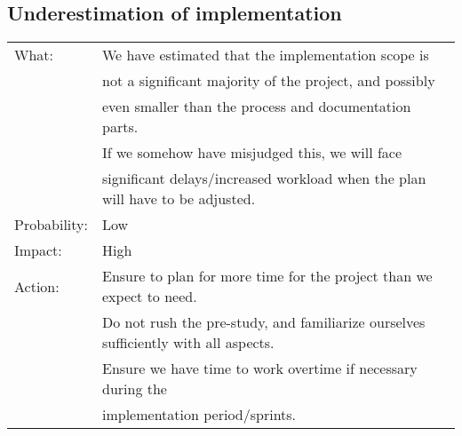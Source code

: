 \documentclass[12pt, a4paper]{article}
\begin{document}
\subsection{Underestimation of implementation}
\begin{tabular}{| l | l |}
	\hline
	What: & We have estimated that the implementation scope is \\
	&not a significant majority of the project, and possibly \\
	&even smaller than the process and documentation parts. \\
	& If we somehow have misjudged this, we will face \\
	& significant delays/increased workload when the plan will have to be adjusted.\\
	\hline
	Probability: & Low \\
	\hline
	Impact: & High \\
	\hline
	Action: & Ensure to plan for more time for the project than we expect to need.\\
	& Do not rush the pre-study, and familiarize ourselves sufficiently with all aspects.\\
	& Ensure we have time to work overtime if necessary during the\\
	& implementation period/sprints.\\
	\hline

\end{tabular}
\end{document}
